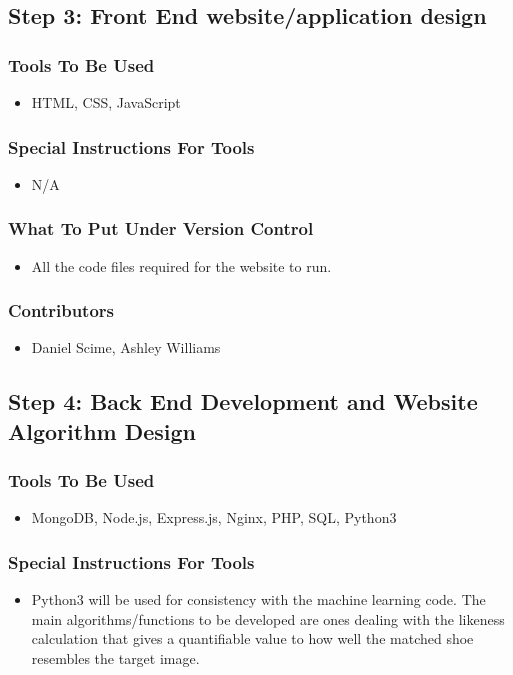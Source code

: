 \documentclass[12pt, titlepage]{article}
\begin{document}
\subsection{Step 3: Front End website/application design}
\subsubsection*{Tools To Be Used}
\begin{itemize}
        \item HTML, CSS, JavaScript
\end{itemize}
\subsubsection*{Special Instructions For Tools}
\begin{itemize}
        \item N/A
\end{itemize}
\subsubsection*{What To Put Under Version Control}
\begin{itemize}
        \item All the code files required for the website to run.
\end{itemize}
\subsubsection*{Contributors}
\begin{itemize}
        \item Daniel Scime, Ashley Williams
\end{itemize}

\subsection{Step 4: Back End Development and Website Algorithm Design}
\subsubsection*{Tools To Be Used}
\begin{itemize}
        \item MongoDB, Node.js, Express.js, Nginx, PHP, SQL, Python3
\end{itemize}
\subsubsection*{Special Instructions For Tools}
\begin{itemize}
        \item Python3 will be used for consistency with the machine learning code. The main algorithms/functions to be developed are ones dealing with the likeness calculation that gives a quantifiable value to how well the matched shoe resembles the target image.
\end{itemize}
\end{document}
